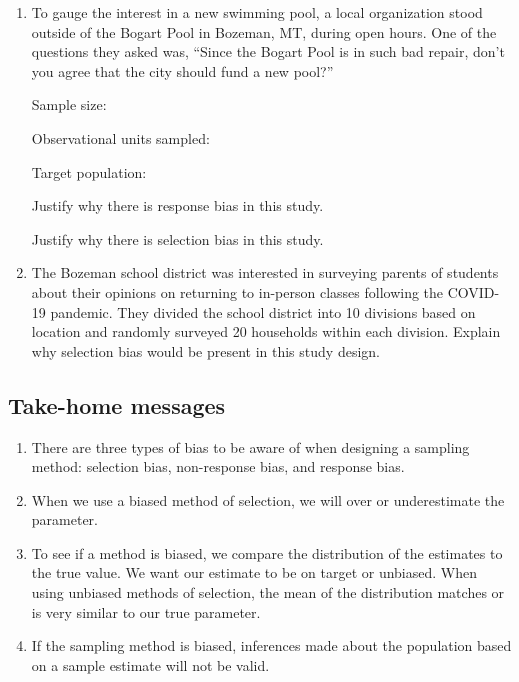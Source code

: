\documentclass[
]{report}
\begin{document}
\begin{enumerate}
\def\labelenumi{\arabic{enumi}.}
\setcounter{enumi}{12}
\item
  To gauge the interest in a new swimming pool, a local organization stood outside of the Bogart Pool in Bozeman, MT, during open hours. One of the questions they asked was, ``Since the Bogart Pool is in such bad repair, don't you agree that the city should fund a new pool?''
  \vspace{0.1in}

  Sample size:
  \vspace{0.3in}

  Observational units sampled:
  \vspace{0.3in}

  Target population:
  \vspace{0.3in}

  Justify why there is response bias in this study.
  \vspace{0.5in}

  Justify why there is selection bias in this study.
  \vspace{0.5in}
\item
  The Bozeman school district was interested in surveying parents of students about their opinions on returning to in-person classes following the COVID-19 pandemic. They divided the school district into 10 divisions based on location and randomly surveyed 20 households within each division. Explain why selection bias would be present in this study design.
  \vspace{1in}
\end{enumerate}

\newpage

\hypertarget{take-home-messages-1}{%
\subsection{Take-home messages}\label{take-home-messages-1}}

\begin{enumerate}
\def\labelenumi{\arabic{enumi}.}
\item
  There are three types of bias to be aware of when designing a sampling method: selection bias, non-response bias, and response bias.
\item
  When we use a biased method of selection, we will over or underestimate the parameter.
\item
  To see if a method is biased, we compare the distribution of the estimates to the true value. We want our estimate to be on target or unbiased. When using unbiased methods of selection, the mean of the distribution matches or is very similar to our true parameter.
\item
  If the sampling method is biased, inferences made about the population based on a sample estimate will not be valid.
\end{enumerate}
\end{document}
